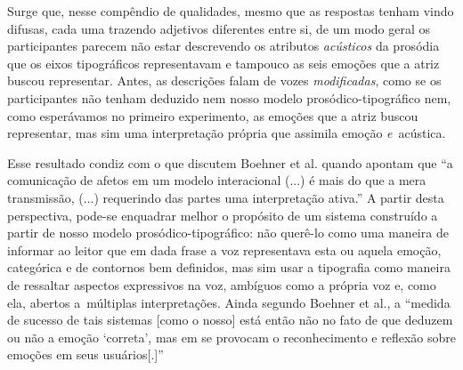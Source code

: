 \documentclass{tufte-handout}
\begin{document}
Surge que, nesse compêndio de qualidades, mesmo que as respostas tenham vindo difusas, cada uma trazendo adjetivos diferentes entre si, de um modo geral os participantes parecem não estar descrevendo os atributos \textit{acústicos} da prosódia que os eixos tipográficos representavam e tampouco as seis emoções que a atriz buscou representar. Antes, as descrições falam de vozes \textit{modificadas}, como se os participantes não tenham deduzido nem nosso modelo prosódico-tipográfico nem, como esperávamos no primeiro experimento, as emoções que a atriz buscou representar, mas sim uma interpretação própria que assimila emoção \textit{e}~acústica.

Esse resultado condiz com o que discutem Boehner et al. quando apontam que ``a comunicação de afetos em um modelo interacional (...) é mais do que a mera transmissão, (...) requerindo das partes uma interpretação ativa.''  A partir desta perspectiva, pode-se enquadrar melhor o propósito de um sistema construído a partir de nosso modelo prosódico-tipográfico: não querê-lo como uma maneira de informar ao leitor que em dada frase a voz representava esta ou aquela emoção, categórica e de contornos bem definidos, mas sim usar a tipografia como maneira de ressaltar aspectos expressivos na voz, ambíguos como a própria voz e, como ela, abertos a~múltiplas interpretações. Ainda segundo Boehner et al., a ``medida de sucesso de tais sistemas [como o nosso] está então não no fato de que deduzem ou não a emoção `correta', mas em se provocam o reconhecimento e reflexão sobre emoções em seus usuários[.]'' 






\end{document}
